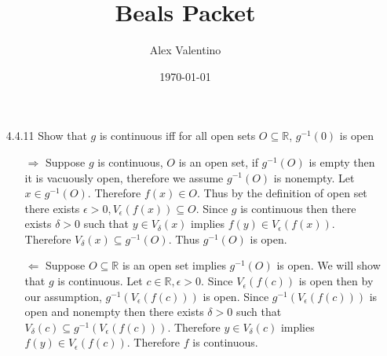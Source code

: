 \documentclass[12pt, letterpaper]{article}
\date{\today}
\author{Alex Valentino}
\title{Beals Packet}
\newcommand{\R}{\mathbb{R}}
\begin{document}
\begin{enumerate}
	\item[4.4.11] Show that $g$ is continuous iff for all open sets $O \subseteq \R$, $g^{-1}(0)$ is open\\
	\begin{itemize}
		\item[$\Rightarrow$] Suppose $g$ is continuous, $O$ is an open set, if $g^{-1}(O)$ is empty then it is vacuously open, therefore we assume $g^{-1}(O)$ is nonempty.  Let $x \in g^{-1}(O)$.  Therefore $f(x) \in O$.  Thus by the definition of open set there exists $\epsilon > 0, V_\epsilon(f(x)) \subseteq O$.  Since $g$ is continuous then there exists $\delta > 0$ such that $y \in V_\delta(x)$ implies $f(y) \in V_\epsilon(f(x))$.  Therefore $V_\delta(x) \subseteq g^{-1}(O)$.
		Thus $g^{-1}(O)$ is open.
		\item[$\Leftarrow$] Suppose $O \subseteq \R$ is an open set implies $g^{-1}(O)$ is open.  We will show that 
		$g$ is continuous.  Let $c \in \R, \epsilon >0$.  Since $V_\epsilon(f(c))$ is open then by our assumption, 
		$g^{-1}(V_\epsilon(f(c)))$ is open.  Since $g^{-1}(V_\epsilon(f(c)))$ is open and nonempty then there exists $\delta > 0$ such that $V_\delta(c) \subseteq g^{-1}(V_\epsilon(f(c)))$.  Therefore $y \in V_\delta(c)$ implies $f(y) \in V_\epsilon(f(c))$.  Therefore $f$ is continuous.   
	\end{itemize}
\end{enumerate}
\end{document}
